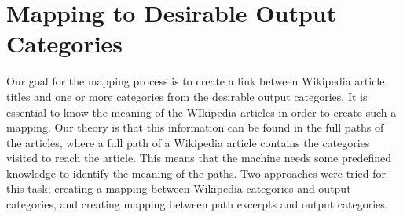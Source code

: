 \section{Mapping to Desirable Output Categories}
Our goal for the mapping process is to create a link between Wikipedia article titles and one or more categories from the desirable output categories. It is essential to know the meaning of the WIkipedia articles in order to create such a mapping. Our theory is that this information can be found in the full paths of the articles, where a 
full path of a Wikipedia article contains the categories visited to reach the article. This means that the  machine needs some predefined knowledge to identify the meaning of the paths. Two approaches were tried for this task; creating a mapping between Wikipedia categories and output categories, and creating mapping between path excerpts and output categories. 






